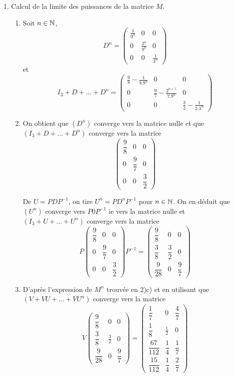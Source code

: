 \begin{enumerate}
\item  Calcul de la limite des puissances de la matrice $M$.
\begin{enumerate}
\item Soit $n\in\mathbb{N}$, $$D^n=\left(\begin{array}{ccc}
\frac 1{9^n}&0&0\\
0&\frac {2^n}{9^n}& 0\\
0&0&\frac 1{3^n}
\end{array}\right)$$ et $$I_3+D+\dots+D^n=\left(\begin{array}{ccc}
\frac 98-\frac 1{8.9^n}&0&0\\
0&\frac 97-\frac{2^{n+1}}{7.9^n}& 0\\
0&0&\frac 32-\frac 1{2.3^n}
\end{array}\right)$$

\item On obtient que $(D^n)$ converge vers la matrice nulle et que $(I_3+D+\dots+D^n)$ converge vers la matrice
\begin{displaymath}
\renewcommand{\arraystretch}{1.5}
\begin{pmatrix}
\dfrac 98&0&0\\
0&\dfrac 97& 0\\
0&0&\dfrac 32
\end{pmatrix}  
\end{displaymath}

De $U=PDP^{-1}$, on tire $U^n=PD^nP^{-1}$ pour $n\in\mathbb{N}$. On en déduit que $(U^n)$ converge vers $P0P^{-1}$ ie vers la matrice nulle
et $(I_3+U+\dots+U^n)$ converge vers la matrice 
\begin{displaymath}
\renewcommand{\arraystretch}{1.9}
P \begin{pmatrix}
\dfrac 98&0&0\\
0&\dfrac 97& 0\\
0&0&\dfrac 32
\end{pmatrix}P^{-1}
=\begin{pmatrix}
\dfrac 98&0&0\\
\dfrac 38&\dfrac 32& 0\\
\dfrac 9{28}&0&\dfrac 97
\end{pmatrix}
\end{displaymath}

\item D'après l'expression de $M^n$ trouvée en 2)c) et en utilisant que $(V+VU+\dots+VU^n)$ converge vers la matrice
\renewcommand{\arraystretch}{1.9}
 $$V\left(\begin{array}{ccc}
\dfrac 98&0&0\\
\dfrac 38&\frac 32& 0\\
\dfrac 9{28}&0&\dfrac 97
\end{array}\right)=\left(\begin{array}{ccc}
\dfrac 1{7}&0&\dfrac 47\\
\dfrac 18&\frac 12& 0\\
\dfrac {67}{112}&\dfrac 14&\dfrac 17\\
\dfrac {15}{112} &\dfrac 14&\dfrac 27
\end{array}\right)$$


\end{enumerate}
\end{enumerate}
